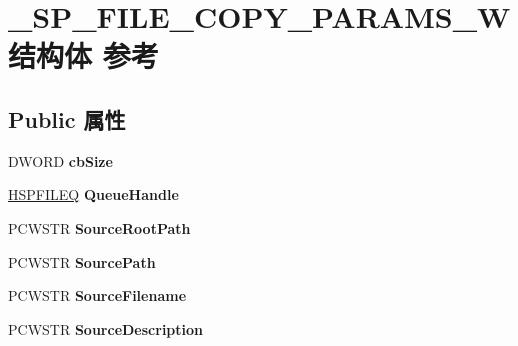 \hypertarget{struct___s_p___f_i_l_e___c_o_p_y___p_a_r_a_m_s___w}{}\section{\+\_\+\+S\+P\+\_\+\+F\+I\+L\+E\+\_\+\+C\+O\+P\+Y\+\_\+\+P\+A\+R\+A\+M\+S\+\_\+\+W结构体 参考}
\label{struct___s_p___f_i_l_e___c_o_p_y___p_a_r_a_m_s___w}
\subsection*{Public 属性}
\begin{DoxyCompactItemize}
\item 
\mbox{\label{struct___s_p___f_i_l_e___c_o_p_y___p_a_r_a_m_s___w_aae28d069a8aaaa2975b79cff19af5143}} 
D\+W\+O\+RD {\bfseries cb\+Size}
\item 
\mbox{\label{struct___s_p___f_i_l_e___c_o_p_y___p_a_r_a_m_s___w_a50cc33e304d7689bb14f72b320731be5}} 
\hyperlink{interfacevoid}{H\+S\+P\+F\+I\+L\+EQ} {\bfseries Queue\+Handle}
\item 
\mbox{\label{struct___s_p___f_i_l_e___c_o_p_y___p_a_r_a_m_s___w_a6aaf8a98fbc1f753fb2e0ecbf902c9c0}} 
P\+C\+W\+S\+TR {\bfseries Source\+Root\+Path}
\item 
\mbox{\label{struct___s_p___f_i_l_e___c_o_p_y___p_a_r_a_m_s___w_a2b24d48b029d3d5fb4e7aec6b251a296}} 
P\+C\+W\+S\+TR {\bfseries Source\+Path}
\item 
\mbox{\label{struct___s_p___f_i_l_e___c_o_p_y___p_a_r_a_m_s___w_aecaeefb549483430b5df1d563ae4492f}} 
P\+C\+W\+S\+TR {\bfseries Source\+Filename}
\item 
\mbox{\label{struct___s_p___f_i_l_e___c_o_p_y___p_a_r_a_m_s___w_af176123fdff6f22dc76e14a7310e7412}} 
P\+C\+W\+S\+TR {\bfseries Source\+Description}
\item 

\end{DoxyCompactItemize}
